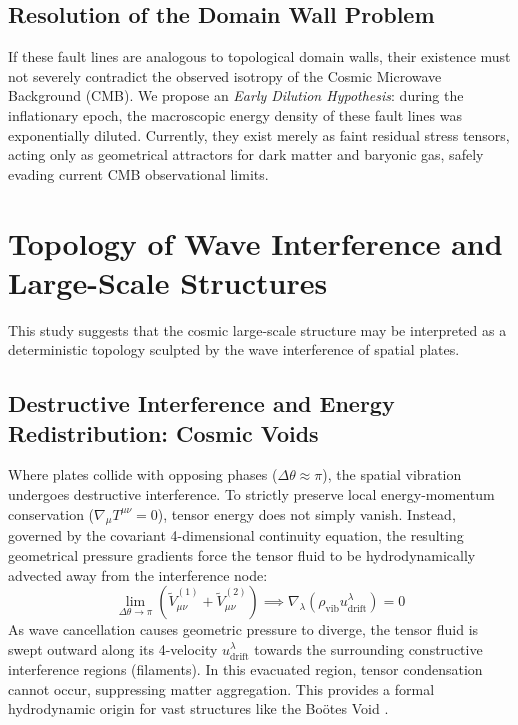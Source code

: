 \documentclass[reprint,amsmath,amssymb,aps,prd]{revtex4-2}
\begin{document}
\subsection{Resolution of the Domain Wall Problem}
If these fault lines are analogous to topological domain walls, their existence must not severely contradict the observed isotropy of the Cosmic Microwave Background (CMB).
We propose an \textit{Early Dilution Hypothesis}: during the inflationary epoch, the macroscopic energy density of these fault lines was exponentially diluted.
Currently, they exist merely as faint residual stress tensors, acting only as geometrical attractors for dark matter and baryonic gas, safely evading current CMB observational limits.

\section{Topology of Wave Interference and Large-Scale Structures}
This study suggests that the cosmic large-scale structure may be interpreted as a deterministic topology sculpted by the wave interference of spatial plates.

\subsection{Destructive Interference and Energy Redistribution: Cosmic Voids}
Where plates collide with opposing phases ($\Delta\theta \approx \pi$), the spatial vibration undergoes destructive interference.
To strictly preserve local energy-momentum conservation ($\nabla_\mu T^{\mu\nu} = 0$), tensor energy does not simply vanish.
Instead, governed by the covariant 4-dimensional continuity equation, the resulting geometrical pressure gradients force the tensor fluid to be hydrodynamically advected away from the interference node:
\begin{equation}
\lim_{\Delta\theta \to \pi} \left( \tilde{V}_{\mu\nu}^{(1)} + \tilde{V}_{\mu\nu}^{(2)} \right) \implies \nabla_\lambda (\rho_{\mathrm{vib}} u^\lambda_{\mathrm{drift}}) = 0
\end{equation}
As wave cancellation causes geometric pressure to diverge, the tensor fluid is swept outward along its 4-velocity $u^\lambda_{\mathrm{drift}}$ towards the surrounding constructive interference regions (filaments).
In this evacuated region, tensor condensation cannot occur, suppressing matter aggregation.
This provides a formal hydrodynamic origin for vast structures like the Bo\"{o}tes Void \cite{Kirshner1981}.
\end{document}
